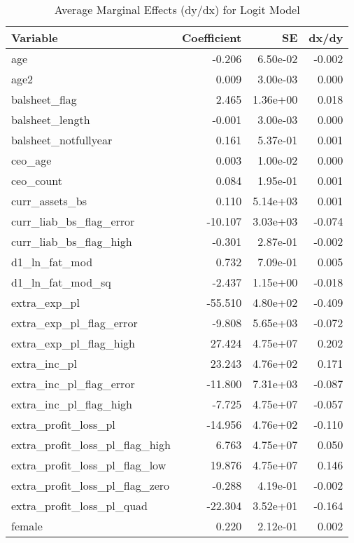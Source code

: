 \begin{table}

\caption{Average Marginal Effects (dy/dx) for Logit Model}
\centering
\begin{tabular}[t]{l|r|r|r}
\hline
Variable & Coefficient & SE & dx/dy\\
\hline
age & -0.206 & 6.50e-02 & -0.002\\
\hline
age2 & 0.009 & 3.00e-03 & 0.000\\
\hline
balsheet\_flag & 2.465 & 1.36e+00 & 0.018\\
\hline
balsheet\_length & -0.001 & 3.00e-03 & 0.000\\
\hline
balsheet\_notfullyear & 0.161 & 5.37e-01 & 0.001\\
\hline
ceo\_age & 0.003 & 1.00e-02 & 0.000\\
\hline
ceo\_count & 0.084 & 1.95e-01 & 0.001\\
\hline
curr\_assets\_bs & 0.110 & 5.14e+03 & 0.001\\
\hline
curr\_liab\_bs\_flag\_error & -10.107 & 3.03e+03 & -0.074\\
\hline
curr\_liab\_bs\_flag\_high & -0.301 & 2.87e-01 & -0.002\\
\hline
d1\_ln\_fat\_mod & 0.732 & 7.09e-01 & 0.005\\
\hline
d1\_ln\_fat\_mod\_sq & -2.437 & 1.15e+00 & -0.018\\
\hline
extra\_exp\_pl & -55.510 & 4.80e+02 & -0.409\\
\hline
extra\_exp\_pl\_flag\_error & -9.808 & 5.65e+03 & -0.072\\
\hline
extra\_exp\_pl\_flag\_high & 27.424 & 4.75e+07 & 0.202\\
\hline
extra\_inc\_pl & 23.243 & 4.76e+02 & 0.171\\
\hline
extra\_inc\_pl\_flag\_error & -11.800 & 7.31e+03 & -0.087\\
\hline
extra\_inc\_pl\_flag\_high & -7.725 & 4.75e+07 & -0.057\\
\hline
extra\_profit\_loss\_pl & -14.956 & 4.76e+02 & -0.110\\
\hline
extra\_profit\_loss\_pl\_flag\_high & 6.763 & 4.75e+07 & 0.050\\
\hline
extra\_profit\_loss\_pl\_flag\_low & 19.876 & 4.75e+07 & 0.146\\
\hline
extra\_profit\_loss\_pl\_flag\_zero & -0.288 & 4.19e-01 & -0.002\\
\hline
extra\_profit\_loss\_pl\_quad & -22.304 & 3.52e+01 & -0.164\\
\hline
female & 0.220 & 2.12e-01 & 0.002\\

\end{tabular}
\end{table}
